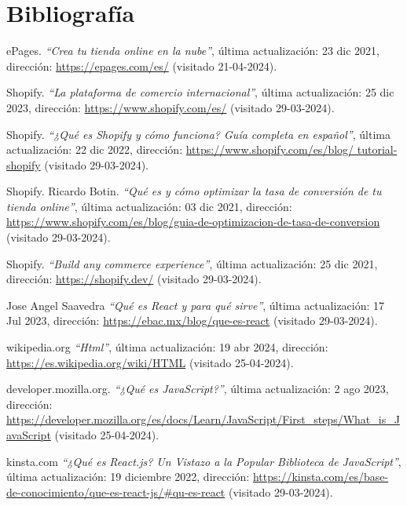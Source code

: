 \documentclass[12pt]{article}
\begin{document}
\section{Bibliografía}
\renewcommand{\refname}{}
\begin{thebibliography}{100} %
    
    ePages. 
    \textit{``Crea tu tienda online en la nube''}, última actualización: 23 dic 2021, dirección: \url{https://epages.com/es/} (visitado 21-04-2024).

    Shopify. 
    \textit{``La plataforma de comercio internacional''}, última actualización: 25 dic 2023, dirección: \url{https://www.shopify.com/es/} (visitado 29-03-2024).

    Shopify. 
    \textit{ ``¿Qué es Shopify y cómo funciona? Guía completa en español''},  última actualización: 22 dic 2022, dirección: \url{https://www.shopify.com/es/blog/
    tutorial-shopify} (visitado 29-03-2024).

    Shopify. Ricardo Botin. 
    \textit{``Qué es y cómo optimizar la tasa de conversión de tu tienda online''}, última actualización: 03 dic 2021, dirección: \url{https://www.shopify.com/es/blog/guia-de-optimizacion-de-tasa-de-conversion} (visitado 29-03-2024).

    Shopify. 
    \textit{``Build any commerce experience''}, última actualización: 25 dic 2021, dirección: \url{https://shopify.dev/} (visitado 29-03-2024).

    Jose Angel Saavedra
    \textit{``Qué es React y para qué sirve''}, última actualización: 17 Jul 2023, dirección: \url{https://ebac.mx/blog/que-es-react} (visitado 29-03-2024).

    wikipedia.org
    \textit{``Html''}, última actualización: 19 abr 2024, dirección: \url{https://es.wikipedia.org/wiki/HTML} (visitado 25-04-2024).

    developer.mozilla.org.
    \textit{``¿Qué es JavaScript?''}, última actualización: 2 ago 2023, dirección: \url{https://developer.mozilla.org/es/docs/Learn/JavaScript/First_steps/What_is_JavaScript} (visitado 25-04-2024).

    kinsta.com
    \textit{``¿Qué es React.js? Un Vistazo a la Popular Biblioteca de JavaScript''}, última actualización: 19 diciembre 2022, dirección: \url{https://kinsta.com/es/base-de-conocimiento/que-es-react-js/#qu-es-react} (visitado 29-03-2024).


\end{thebibliography}
\end{document}
